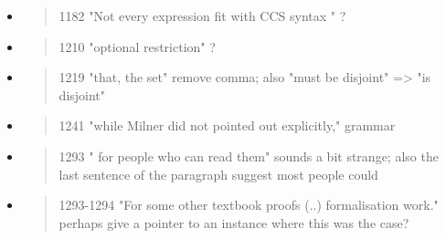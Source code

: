 \begin{itemize}
  \item \begin{quote}
1182 "Not every expression fit with CCS syntax " ?
\end{quote}
  \Mark

  \item \begin{quote}
1210 "optional restriction" ?
\end{quote}
  \Mark

  \item \begin{quote}
1219 "that, the set" remove comma; also "must be disjoint" => "is disjoint"
\end{quote}
  \Mark

  \item \begin{quote}
1241 "while Milner did not pointed out explicitly," grammar
\end{quote}
  \Mark

  \item \begin{quote}
1293 " for people who can read them" sounds a bit strange; also the last sentence of the paragraph suggest most people could
\end{quote}
  \Mark

  \item \begin{quote}
1293-1294 "For some other textbook proofs (..) formalisation work." perhaps give a pointer to an instance where this was the case?
\end{quote}
  \Mark

\end{itemize} 
